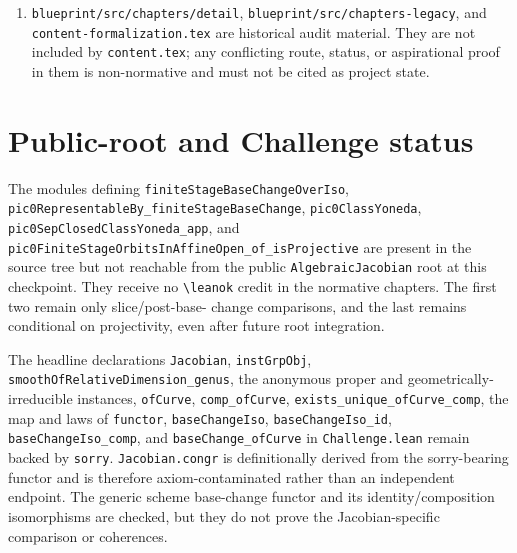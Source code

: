 \begin{remark}
\begin{enumerate}
    \texttt{ofChartsOfCompactSpace}, \texttt{ofAbelImage},
    \texttt{ofAbelLifts}, \texttt{ofChartsOfAbelImage},
    \texttt{ofChartsOfAbelLifts}, \texttt{ofPic0ClassSurjective}, and
    \texttt{PicRepDatum.toJacobianDataOfAbelLifts} are downstream packaging
    devices.  Likewise \texttt{Pic0RepresentabilityOverlap} and
    \texttt{Pic0RepresentabilityDescentData} start from an already supplied
    representation.  None replaces the quotient-carrier handoff in R8--R9.
  \item \texttt{blueprint/src/chapters/detail},
    \texttt{blueprint/src/chapters-legacy}, and
    \texttt{content-formalization.tex} are historical audit material.  They
    are not included by \texttt{content.tex}; any conflicting route, status,
    or aspirational proof in them is non-normative and must not be cited as
    project state.
  \end{enumerate}
\end{remark}

\section{Public-root and Challenge status}
\label{route-app-challenge-status}

The modules defining \texttt{finiteStageBaseChangeOverIso},
\texttt{pic0RepresentableBy\_finiteStageBaseChange},
\texttt{pic0ClassYoneda},
\texttt{pic0SepClosedClassYoneda\_app}, and
\texttt{pic0FiniteStageOrbitsInAffineOpen\_of\_isProjective} are present in
the source tree but not reachable from the public \texttt{AlgebraicJacobian}
root at this checkpoint.  They receive no \texttt{\textbackslash leanok}
credit in the normative chapters.  The first two remain only slice/post-base-
change comparisons, and the last remains conditional on projectivity, even after
future root integration.

The headline declarations \texttt{Jacobian}, \texttt{instGrpObj},
\texttt{smoothOfRelativeDimension\_genus}, the anonymous proper and
geometrically-irreducible instances, \texttt{ofCurve},
\texttt{comp\_ofCurve}, \texttt{exists\_unique\_ofCurve\_comp}, the map and
laws of \texttt{functor}, \texttt{baseChangeIso},
\texttt{baseChangeIso\_id}, \texttt{baseChangeIso\_comp}, and
\texttt{baseChange\_ofCurve} in \texttt{Challenge.lean} remain backed by
\texttt{sorry}.  \texttt{Jacobian.congr} is definitionally derived from the
sorry-bearing functor and is therefore axiom-contaminated rather than an
independent endpoint.  The generic scheme base-change functor and its
identity/composition isomorphisms are checked, but they do not prove the
Jacobian-specific comparison or coherences.

